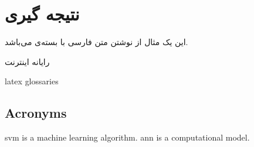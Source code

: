 \chapter{نتیجه گیری}

\clearpage

این یک مثال از نوشتن متن فارسی با بسته‌ی  می‌باشد.

\gls{رایانه}
\gls{اینترنت}
\begin{latin}
\gls{latex}
\gls{glossaries}
\section{Acronyms}
        \gls{svm} is a machine learning algorithm.
        \gls{ann} is a computational model.

\end{latin}

